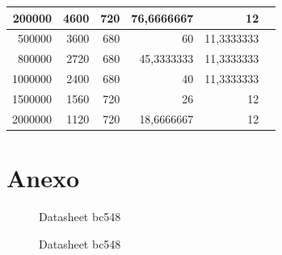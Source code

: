\documentclass[12pt, letterpaper]{article}
\begin{document}
\begin{table}[H]
\begin{tabular}{|r|r|r|r|r|r}
    \cmidrule   200000 & 4600  & 720   & 76,6666667 & 12    &  \\
    
    \cmidrule   500000 & 3600  & 680   & 60    & 11,3333333 &  \\
    
    \cmidrule    800000 & 2720  & 680   & 45,3333333 & 11,3333333 &  \\
    
    \cmidrule    1000000 & 2400  & 680   & 40    & 11,3333333 &  \\
    \cmidrule   1500000 & 1560  & 720   & 26    & 12    &  \\
    \cmidrule    2000000 & 1120  & 720   & 18,6666667 & 12    &  \\
    \cmidrule    
    \end{tabular}
    \label{tab:tab_resp_frec}
\end{table}

\newpage
\section{Anexo}
\begin{figure}[H]
    \centering
    
    \caption{Datasheet bc548}
    \label{fig:datasheet_bc548}
\end{figure}
\newpage
\begin{figure}[H]
    \centering
    
    \caption{Datasheet bc548}
\end{figure}


\label{LastPage}
\end{document}
